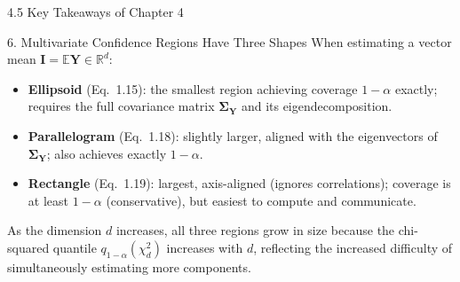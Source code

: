 \documentclass[aspectratio=169,10pt]{beamer}
\begin{document}
\begin{frame}[allowframebreaks]{4.5 Key Takeaways of Chapter 4}
\begin{alertblock}{6. Multivariate Confidence Regions Have Three Shapes}
  When estimating a vector mean $\mathbf{I} = \mathbb{E}\mathbf{Y} \in \mathbb{R}^d$:
  \begin{itemize}
    \item \textbf{Ellipsoid} (Eq.\ 1.15): the smallest region achieving
      coverage $1-\alpha$ exactly; requires the full covariance matrix
      $\boldsymbol{\Sigma}_{\mathbf{Y}}$ and its eigendecomposition.
    \item \textbf{Parallelogram} (Eq.\ 1.18): slightly larger, aligned with
      the eigenvectors of $\boldsymbol{\Sigma}_{\mathbf{Y}}$; also achieves
      exactly $1-\alpha$.
    \item \textbf{Rectangle} (Eq.\ 1.19): largest, axis-aligned (ignores
      correlations); coverage is at least $1-\alpha$ (conservative), but
      easiest to compute and communicate.
  \end{itemize}
  As the dimension $d$ increases, all three regions grow in size because the
  chi-squared quantile $q_{1-\alpha}(\chi_d^2)$ increases with $d$, reflecting
  the increased difficulty of simultaneously estimating more components.
\end{alertblock}

\end{frame}
\end{document}

